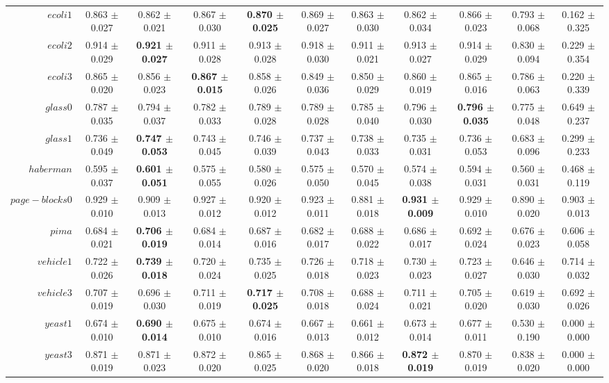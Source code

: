 \begin{table}[!ht]
{\begin{tabular}{r c c c c c c c c c c}
$ecoli1$ & 0.863 $\pm$ 0.027 & 0.862 $\pm$ 0.021 & 0.867 $\pm$ 0.030 & \textbf{0.870 $\pm$ 0.025} & 0.869 $\pm$ 0.027 & 0.863 $\pm$ 0.030 & 0.862 $\pm$ 0.034 & 0.866 $\pm$ 0.023 & 0.793 $\pm$ 0.068 & 0.162 $\pm$ 0.325 \\
$ecoli2$ & 0.914 $\pm$ 0.029 & \textbf{0.921 $\pm$ 0.027} & 0.911 $\pm$ 0.028 & 0.913 $\pm$ 0.028 & 0.918 $\pm$ 0.030 & 0.911 $\pm$ 0.021 & 0.913 $\pm$ 0.027 & 0.914 $\pm$ 0.029 & 0.830 $\pm$ 0.094 & 0.229 $\pm$ 0.354 \\
$ecoli3$ & 0.865 $\pm$ 0.020 & 0.856 $\pm$ 0.023 & \textbf{0.867 $\pm$ 0.015} & 0.858 $\pm$ 0.026 & 0.849 $\pm$ 0.036 & 0.850 $\pm$ 0.029 & 0.860 $\pm$ 0.019 & 0.865 $\pm$ 0.016 & 0.786 $\pm$ 0.063 & 0.220 $\pm$ 0.339 \\
$glass0$ & 0.787 $\pm$ 0.035 & 0.794 $\pm$ 0.037 & 0.782 $\pm$ 0.033 & 0.789 $\pm$ 0.028 & 0.789 $\pm$ 0.028 & 0.785 $\pm$ 0.040 & 0.796 $\pm$ 0.030 & \textbf{0.796 $\pm$ 0.035} & 0.775 $\pm$ 0.048 & 0.649 $\pm$ 0.237 \\
$glass1$ & 0.736 $\pm$ 0.049 & \textbf{0.747 $\pm$ 0.053} & 0.743 $\pm$ 0.045 & 0.746 $\pm$ 0.039 & 0.737 $\pm$ 0.043 & 0.738 $\pm$ 0.033 & 0.735 $\pm$ 0.031 & 0.736 $\pm$ 0.053 & 0.683 $\pm$ 0.096 & 0.299 $\pm$ 0.233 \\
$haberman$ & 0.595 $\pm$ 0.037 & \textbf{0.601 $\pm$ 0.051} & 0.575 $\pm$ 0.055 & 0.580 $\pm$ 0.026 & 0.575 $\pm$ 0.050 & 0.570 $\pm$ 0.045 & 0.574 $\pm$ 0.038 & 0.594 $\pm$ 0.031 & 0.560 $\pm$ 0.031 & 0.468 $\pm$ 0.119 \\
$page-blocks0$ & 0.929 $\pm$ 0.010 & 0.909 $\pm$ 0.013 & 0.927 $\pm$ 0.012 & 0.920 $\pm$ 0.012 & 0.923 $\pm$ 0.011 & 0.881 $\pm$ 0.018 & \textbf{0.931 $\pm$ 0.009} & 0.929 $\pm$ 0.010 & 0.890 $\pm$ 0.020 & 0.903 $\pm$ 0.013 \\
$pima$ & 0.684 $\pm$ 0.021 & \textbf{0.706 $\pm$ 0.019} & 0.684 $\pm$ 0.014 & 0.687 $\pm$ 0.016 & 0.682 $\pm$ 0.017 & 0.688 $\pm$ 0.022 & 0.686 $\pm$ 0.017 & 0.692 $\pm$ 0.024 & 0.676 $\pm$ 0.023 & 0.606 $\pm$ 0.058 \\
$vehicle1$ & 0.722 $\pm$ 0.026 & \textbf{0.739 $\pm$ 0.018} & 0.720 $\pm$ 0.024 & 0.735 $\pm$ 0.025 & 0.726 $\pm$ 0.018 & 0.718 $\pm$ 0.023 & 0.730 $\pm$ 0.023 & 0.723 $\pm$ 0.027 & 0.646 $\pm$ 0.030 & 0.714 $\pm$ 0.032 \\
$vehicle3$ & 0.707 $\pm$ 0.019 & 0.696 $\pm$ 0.030 & 0.711 $\pm$ 0.019 & \textbf{0.717 $\pm$ 0.025} & 0.708 $\pm$ 0.018 & 0.688 $\pm$ 0.024 & 0.711 $\pm$ 0.021 & 0.705 $\pm$ 0.020 & 0.619 $\pm$ 0.030 & 0.692 $\pm$ 0.026 \\
$yeast1$ & 0.674 $\pm$ 0.010 & \textbf{0.690 $\pm$ 0.014} & 0.675 $\pm$ 0.010 & 0.674 $\pm$ 0.016 & 0.667 $\pm$ 0.013 & 0.661 $\pm$ 0.012 & 0.673 $\pm$ 0.014 & 0.677 $\pm$ 0.011 & 0.530 $\pm$ 0.190 & 0.000 $\pm$ 0.000 \\
$yeast3$ & 0.871 $\pm$ 0.019 & 0.871 $\pm$ 0.023 & 0.872 $\pm$ 0.020 & 0.865 $\pm$ 0.025 & 0.868 $\pm$ 0.020 & 0.866 $\pm$ 0.018 & \textbf{0.872 $\pm$ 0.019} & 0.870 $\pm$ 0.019 & 0.838 $\pm$ 0.020 & 0.000 $\pm$ 0.000 \\
\end{tabular}}
\end{table}
